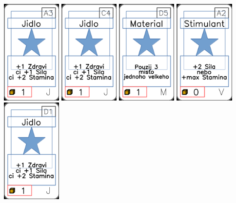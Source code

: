 \documentclass[a4paper]{article}
\begin{document}
	\includegraphics[width=3.0cm]{img-1_2}
	\includegraphics[width=3.0cm]{img-1_13}
	\includegraphics[width=3.0cm]{img-1_49}
	\includegraphics[width=3.0cm]{img-1_61}
	\includegraphics[width=3.0cm]{img-1_15}
\end{document}

